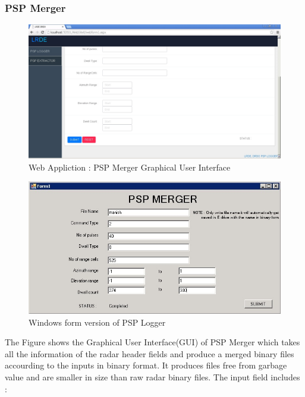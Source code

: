 \documentclass[12pt]{article} %
\begin{document}
  \subsubsection{PSP Merger}
    \begin{figure}[H]
\includegraphics[width=\linewidth]{extractor2.jpg}
  \caption{Web Appliction : PSP Merger Graphical User Interface}
  \label{fig:figure 26}
\end{figure}  
 \begin{figure}[H]
\includegraphics[width=\linewidth]{PSPmerger.jpg}
  \caption{Windows form version of PSP Logger}
  \label{fig:figure 27}
  \end{figure}
 The Figure shows the Graphical User Interface(GUI) of PSP Merger which takes all the information of the radar header fields and produce a merged binary files accourding to the inputs  in binary format. It produces files free from garbage value and are smaller in size than raw radar binary files.
  The input field includes :
\end{document}
